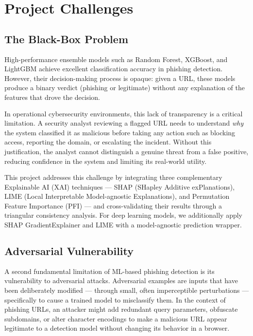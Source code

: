 \section{Project Challenges}

\subsection{The Black-Box Problem}

High-performance ensemble models such as Random Forest, XGBoost, and LightGBM achieve excellent classification accuracy in phishing detection. However, their decision-making process is opaque: given a URL, these models produce a binary verdict (phishing or legitimate) without any explanation of the features that drove the decision.

In operational cybersecurity environments, this lack of transparency is a critical limitation. A security analyst reviewing a flagged URL needs to understand \textit{why} the system classified it as malicious before taking any action such as blocking access, reporting the domain, or escalating the incident. Without this justification, the analyst cannot distinguish a genuine threat from a false positive, reducing confidence in the system and limiting its real-world utility.

This project addresses this challenge by integrating three complementary Explainable AI (XAI) techniques — SHAP (SHapley Additive exPlanations), LIME (Local Interpretable Model-agnostic Explanations), and Permutation Feature Importance (PFI) — and cross-validating their results through a triangular consistency analysis. For deep learning models, we additionally apply SHAP GradientExplainer and LIME with a model-agnostic prediction wrapper.

\subsection{Adversarial Vulnerability}

A second fundamental limitation of ML-based phishing detection is its vulnerability to adversarial attacks. Adversarial examples are inputs that have been deliberately modified — through small, often imperceptible perturbations — specifically to cause a trained model to misclassify them. In the context of phishing URLs, an attacker might add redundant query parameters, obfuscate subdomains, or alter character encodings to make a malicious URL appear legitimate to a detection model without changing its behavior in a browser.

